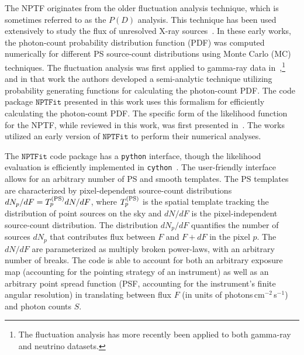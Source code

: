 The NPTF originates from the older fluctuation analysis technique, which is sometimes referred to as the $P(D)$ analysis.  This technique has been used extensively to study the flux of unresolved X-ray sources~\cite{hasinger1993,1993MNRAS.262..619G,Gendreau:1997di,Perri:2000fv,Miyaji:2001dp}.  In these early works, the photon-count probability distribution function (PDF) was computed numerically for different PS source-count distributions using Monte Carlo (MC) techniques.  The fluctuation analysis was first applied to gamma-ray data in~\cite{Malyshev:2011zi},\footnote{The fluctuation analysis has more recently been applied to both gamma-ray \cite{Feyereisen:2015cea} and neutrino \cite{Feyereisen:2016fzb} datasets.} and in that work the authors developed a semi-analytic technique utilizing probability generating functions for calculating the photon-count PDF.  The code package $\texttt{NPTFit}$ presented in this work uses this formalism for efficiently calculating the photon-count PDF.  The specific form of the likelihood function for the NPTF, while reviewed in this work, was first presented in~\cite{Lee:2015fea}.  The works~\cite{Lee:2015fea,Linden:2016rcf,Lisanti:2016jub} utilized an early version of $\texttt{NPTFit}$ to perform their numerical analyses. 

The $\texttt{NPTFit}$ code package has a \texttt{python} interface, though the likelihood evaluation is efficiently implemented in \texttt{cython}~\cite{behnel2010cython}.  The user-friendly interface allows for an arbitrary number of PS and smooth templates.  The PS templates are characterized by pixel-dependent source-count distributions $dN_p/dF = T_p^{({\rm PS})} dN/dF$, where $T_p^{({\rm PS})}$ is the spatial template tracking the distribution of point sources on the sky and $dN/dF$ is the pixel-independent source-count distribution.  The distribution $dN_p/dF$ quantifies the number of sources $dN_p$ that contributes flux between $F$ and $F + dF$ in the pixel $p$.  The $dN/dF$ are parameterized as multiply broken power-laws, with an arbitrary number of breaks.  The code is able to account for both an arbitrary exposure map (accounting for the pointing strategy of an instrument) as well as an arbitrary point spread function (PSF, accounting for the instrument's finite angular resolution) in translating between flux $F$ (in units of photons\,cm$^{-2}$\,s$^{-1}$) and photon counts $S$. 

